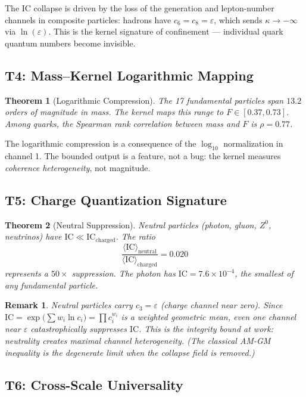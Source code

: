 \documentclass[
  aps,
  prd,
  twocolumn,
  superscriptaddress,
  nofootinbib,
  floatfix
]{revtex4-2}
\newtheorem{theorem}{Theorem}
\newtheorem{remark}{Remark}
\newcommand{\eps}{\varepsilon}
\newcommand{\beq}{\begin{equation}}
\newcommand{\eeq}{\end{equation}}
\newcommand{\IC}{\mathrm{IC}}
\begin{document}
The IC collapse is driven by the loss of the generation and
lepton-number channels in composite particles: hadrons have
$c_6 = c_8 = \eps$, which sends $\kappa \to -\infty$ via
$\ln(\eps)$.  This is the kernel signature of confinement ---
individual quark quantum numbers become invisible.

\subsection{T4: Mass--Kernel Logarithmic Mapping}

\begin{theorem}[Logarithmic Compression]\label{thm:T4}
The 17 fundamental particles span $13.2$ orders of magnitude
in mass.  The kernel maps this range to $F \in [0.37, 0.73]$.
Among quarks, the Spearman rank correlation between mass and
$F$ is $\rho = 0.77$.
\end{theorem}

The logarithmic compression is a consequence of the $\log_{10}$
normalization in channel 1.  The bounded output is a feature,
not a bug: the kernel measures \emph{coherence heterogeneity},
not magnitude.

\subsection{T5: Charge Quantization Signature}

\begin{theorem}[Neutral Suppression]\label{thm:T5}
Neutral particles (photon, gluon, $Z^0$, neutrinos) have
$\IC \ll \IC_{\text{charged}}$.  The ratio
\beq
  \frac{\langle \IC \rangle_{\text{neutral}}}
       {\langle \IC \rangle_{\text{charged}}} = 0.020
\eeq
represents a $50\times$ suppression.  The photon has
$\IC = 7.6 \times 10^{-4}$, the smallest of any fundamental
particle.
\end{theorem}

\begin{remark}
Neutral particles carry $c_3 = \eps$ (charge channel near zero).
Since $\IC = \exp\!\bigl(\sum w_i \ln c_i\bigr) = \prod c_i^{w_i}$
is a weighted geometric mean, even one channel near $\eps$
catastrophically suppresses $\IC$.  This is the integrity bound
at work: neutrality creates maximal channel heterogeneity.
(The classical AM-GM inequality is the degenerate limit when
the collapse field is removed.)
\end{remark}

\subsection{T6: Cross-Scale Universality}
\end{document}
